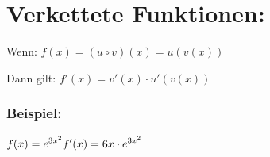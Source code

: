 \documentclass{article}
\begin{document}
    \section*{Verkettete Funktionen:}
    Wenn: \break
    \begin{math}
            {\displaystyle f(x) = (u \circ v)(x) = u(v(x))}
    \end{math}

    Dann gilt:\break
        \begin{math}
            {\displaystyle f'(x) = v'(x) \cdot u'(v(x))}
        \end{math}
    

    
    \subsubsection*{Beispiel:}
        \begin{math}
            {\displaystyle f(x) = e^{3x^2}} \break\break
            {\displaystyle f'(x) = 6x \cdot e^{3x^2}}
        \end{math}
    
\end{document}
